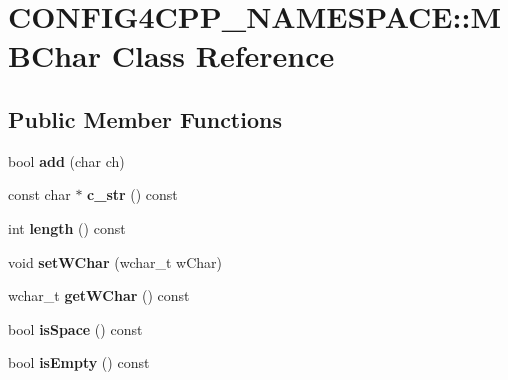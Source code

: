 \hypertarget{classCONFIG4CPP__NAMESPACE_1_1MBChar}{\section{C\-O\-N\-F\-I\-G4\-C\-P\-P\-\_\-\-N\-A\-M\-E\-S\-P\-A\-C\-E\-:\-:M\-B\-Char Class Reference}
\label{classCONFIG4CPP__NAMESPACE_1_1MBChar}
}
\subsection*{Public Member Functions}
\begin{DoxyCompactItemize}
\item 
\hypertarget{classCONFIG4CPP__NAMESPACE_1_1MBChar_a8148d061decb5da0d1ab30c4ff309026}{bool {\bfseries add} (char ch)}\label{classCONFIG4CPP__NAMESPACE_1_1MBChar_a8148d061decb5da0d1ab30c4ff309026}

\item 
\hypertarget{classCONFIG4CPP__NAMESPACE_1_1MBChar_a1003f4b0c976c28244cff7f9d222fb74}{const char $\ast$ {\bfseries c\-\_\-str} () const }\label{classCONFIG4CPP__NAMESPACE_1_1MBChar_a1003f4b0c976c28244cff7f9d222fb74}

\item 
\hypertarget{classCONFIG4CPP__NAMESPACE_1_1MBChar_a2658f6778bcd1d6f3c00b07426bfaea3}{int {\bfseries length} () const }\label{classCONFIG4CPP__NAMESPACE_1_1MBChar_a2658f6778bcd1d6f3c00b07426bfaea3}

\item 
\hypertarget{classCONFIG4CPP__NAMESPACE_1_1MBChar_a6ee4ba3a206e9cd7bc438b61fbee9b73}{void {\bfseries set\-W\-Char} (wchar\-\_\-t w\-Char)}\label{classCONFIG4CPP__NAMESPACE_1_1MBChar_a6ee4ba3a206e9cd7bc438b61fbee9b73}

\item 
\hypertarget{classCONFIG4CPP__NAMESPACE_1_1MBChar_ac4b8e859135f90a9b2943b189b610291}{wchar\-\_\-t {\bfseries get\-W\-Char} () const }\label{classCONFIG4CPP__NAMESPACE_1_1MBChar_ac4b8e859135f90a9b2943b189b610291}

\item 
\hypertarget{classCONFIG4CPP__NAMESPACE_1_1MBChar_aeb8283f31625266ca7024de92165d3a1}{bool {\bfseries is\-Space} () const }\label{classCONFIG4CPP__NAMESPACE_1_1MBChar_aeb8283f31625266ca7024de92165d3a1}

\item 
\hypertarget{classCONFIG4CPP__NAMESPACE_1_1MBChar_a444a68c1b4e0b193e0504b4bd1df62c6}{bool {\bfseries is\-Empty} () const }\label{classCONFIG4CPP__NAMESPACE_1_1MBChar_a444a68c1b4e0b193e0504b4bd1df62c6}


\end{DoxyCompactItemize}
